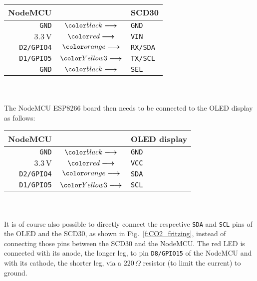 \documentclass[12pt,a4paper]{article}
\newcommand*{\mathcolor}{}
\def\mathcolor#1#{\mathcoloraux{#1}}
\newcommand*{\mathcoloraux}[3]{%
  \protect\leavevmode
  \begingroup
    \color#1{#2}#3%
  \endgroup
}
\begin{document}
\begin{tabular}{rcl}\toprule
	NodeMCU		& & SCD30\\\hline
	\texttt{GND}		& $\mathcolor{black}{\boldsymbol{\longrightarrow}}$	& \texttt{GND}\\
	$3.3\,\mathrm{V}$	& $\mathcolor{red}{\boldsymbol{\longrightarrow}}$		& \texttt{VIN}\\
	\texttt{D2/GPIO4}	& $\mathcolor{orange}{\boldsymbol{\longrightarrow}}$	& \texttt{RX/SDA}\\
	\texttt{D1/GPIO5}	& $\mathcolor{Yellow3}{\boldsymbol{\longrightarrow}}$	& \texttt{TX/SCL}\\
	\texttt{GND}		& $\mathcolor{black}{\boldsymbol{\longrightarrow}}$	& \texttt{SEL}\\	
	\bottomrule
\end{tabular}\\
\quad\\

The NodeMCU ESP8266 board then needs to be connected to the OLED display as follows:\\

\begin{tabular}{rcl}\toprule
	NodeMCU		& & OLED display\\\hline
	\texttt{GND}		& $\mathcolor{black}{\boldsymbol{\longrightarrow}}$	& \texttt{GND}\\
	$3.3\,\mathrm{V}$	& $\mathcolor{red}{\boldsymbol{\longrightarrow}}$		& \texttt{VCC}\\
	\texttt{D2/GPIO4}	& $\mathcolor{orange}{\boldsymbol{\longrightarrow}}$ 	& \texttt{SDA}\\
	\texttt{D1/GPIO5}	& $\mathcolor{Yellow3}{\boldsymbol{\longrightarrow}}$	& \texttt{SCL}\\
	\bottomrule
\end{tabular}\\
\quad\\

It is of course also possible to directly connect the respective \texttt{SDA} and \texttt{SCL} pins of the OLED and the SCD30, as shown in Fig.~\ref{f:CO2_fritzing}, instead of connecting those pins between the SCD30 and the NodeMCU. The red LED is connected with its anode, the longer leg, to pin \texttt{D8/GPIO15} of the NodeMCU and with its cathode, the shorter leg, via a $220\,\Omega$ resistor (to limit the current) to ground.  
\end{document}
